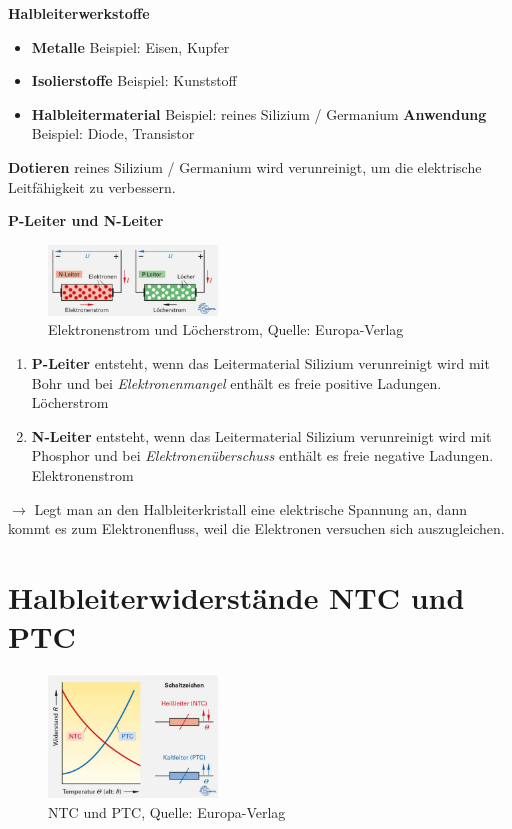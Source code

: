 \textbf{Halbleiterwerkstoffe}

\begin{itemize}
\item
  \textbf{Metalle} Beispiel: Eisen, Kupfer
\item
  \textbf{Isolierstoffe} Beispiel: Kunststoff
\item
  \textbf{Halbleitermaterial} Beispiel: reines Silizium / Germanium
  \textbf{Anwendung} Beispiel: Diode, Transistor
\end{itemize}

\textbf{Dotieren} reines Silizium / Germanium wird verunreinigt, um die
elektrische Leitfähigkeit zu verbessern.

\textbf{P-Leiter und N-Leiter}

\begin{figure}[!ht]%
\centering
\includegraphics[width=0.4\textwidth]{images/Sensoren/Sensoren-1.pdf}
\caption{Elektronenstrom und Löcherstrom, Quelle: Europa-Verlag}
\end{figure}

\begin{enumerate}
\item
  \textbf{P-Leiter} entsteht, wenn das Leitermaterial Silizium
  verunreinigt wird mit Bohr und bei \emph{Elektronenmangel} enthält es
  freie positive Ladungen. Löcherstrom
\item
  \textbf{N-Leiter} entsteht, wenn das Leitermaterial Silizium
  verunreinigt wird mit Phosphor und bei \emph{Elektronenüberschuss}
  enthält es freie negative Ladungen. Elektronenstrom
\end{enumerate}

$\to$ Legt man an den Halbleiterkristall eine elektrische Spannung an,
dann kommt es zum Elektronenfluss, weil die Elektronen versuchen sich
auszugleichen.

\section{Halbleiterwiderstände NTC und
PTC}\label{halbleiterwiderstaende-ntc-und-ptc}

\begin{figure}[!ht]%
\centering
\includegraphics[width=0.4\textwidth]{images/Sensoren/Sensoren-2.pdf}
\caption{NTC und PTC, Quelle: Europa-Verlag}
\end{figure}

